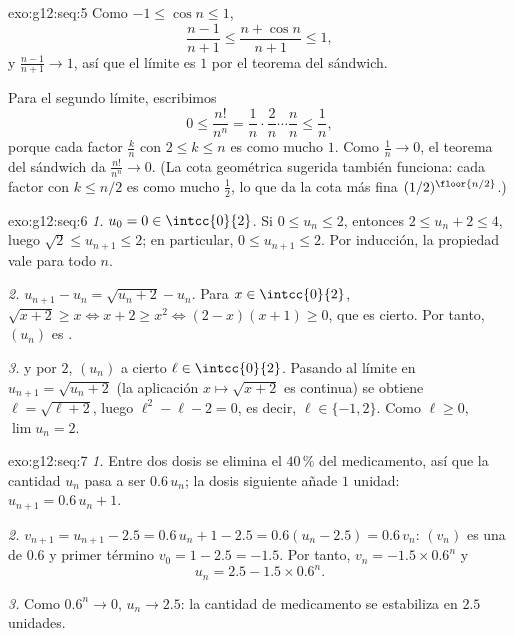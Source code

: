 \begin{solution}{exo:g12:seq:5}
Como $-1 \leq \cos n \leq 1$,
\[
\frac{n-1}{n+1} \leq \frac{n + \cos n}{n+1} \leq 1,
\]
y $\frac{n-1}{n+1} \to 1$, así que el límite es $1$ por el teorema del
sándwich.

Para el segundo límite, escribimos
\[
0 \leq \frac{n!}{n^n}
= \frac{1}{n}\cdot\frac{2}{n}\cdots\frac{n}{n}
\leq \frac{1}{n},
\]
porque cada factor $\frac{k}{n}$ con $2 \leq k \leq n$ es como mucho $1$.
Como $\frac1n \to 0$, el teorema del sándwich da $\frac{n!}{n^n} \to 0$.
(La cota geométrica sugerida también funciona: cada factor con
$k \leq n/2$ es como mucho $\frac12$, lo que da la cota más fina
$(1/2)^{\floor{n/2}}$.)
\end{solution}

\begin{solution}{exo:g12:seq:6}
\emph{1.} $u_0 = 0 \in \intcc{0}{2}$. Si $0 \leq u_n \leq 2$, entonces
$2 \leq u_n + 2 \leq 4$, luego $\sqrt{2} \leq u_{n+1} \leq 2$; en
particular, $0 \leq u_{n+1} \leq 2$. Por inducción, la propiedad vale para
todo $n$.

\emph{2.} $u_{n+1} - u_n = \sqrt{u_n + 2} - u_n$. Para
$x \in \intcc{0}{2}$, $\sqrt{x+2} \geq x \iff x + 2 \geq x^2 \iff
(2-x)(x+1) \geq 0$, que es cierto. Por tanto, $(u_n)$ es .

\emph{3.}  y  por $2$, $(u_n)$  a
cierto $\ell \in \intcc{0}{2}$. Pasando al límite en
$u_{n+1} = \sqrt{u_n + 2}$ (la aplicación $x \mapsto \sqrt{x+2}$ es
continua) se obtiene $\ell = \sqrt{\ell + 2}$, luego
$\ell^2 - \ell - 2 = 0$, es decir, $\ell \in \{-1, 2\}$. Como
$\ell \geq 0$, $\lim u_n = 2$.
\end{solution}

\begin{solution}{exo:g12:seq:7}
\emph{1.} Entre dos dosis se elimina el $40\,\%$ del medicamento, así que
la cantidad $u_n$ pasa a ser $0.6\,u_n$; la dosis siguiente añade $1$
unidad: $u_{n+1} = 0.6\,u_n + 1$.

\emph{2.} $v_{n+1} = u_{n+1} - 2.5 = 0.6\,u_n + 1 - 2.5 = 0.6(u_n - 2.5)
= 0.6\,v_n$: $(v_n)$ es una  de  $0.6$ y primer
término $v_0 = 1 - 2.5 = -1.5$. Por tanto,
$v_n = -1.5 \times 0.6^n$ y
\[
u_n = 2.5 - 1.5 \times 0.6^n .
\]

\emph{3.} Como $0.6^n \to 0$, $u_n \to 2.5$: la cantidad de medicamento se
estabiliza en $2.5$ unidades.
\end{solution}

